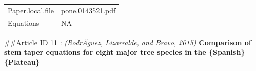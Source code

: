 \documentclass[]{article}
\begin{document}
\begin{longtable}[]{@{}ll@{}}
\begin{minipage}[t]{0.21\columnwidth}\raggedright
Paper.local.file\strut
\end{minipage} & \begin{minipage}[t]{0.73\columnwidth}\raggedright
pone.0143521.pdf\strut
\end{minipage}\tabularnewline
\begin{minipage}[t]{0.21\columnwidth}\raggedright
Equations\strut
\end{minipage} & \begin{minipage}[t]{0.73\columnwidth}\raggedright
NA\strut
\end{minipage}\tabularnewline
\bottomrule
\end{longtable}

\#\#Article ID 11 : \emph{(RodrÃ­guez, Lizarralde, and Bravo, 2015)}
\textbf{Comparison of stem taper equations for eight major tree species
in the \{Spanish\} \{Plateau\}}
\end{document}
